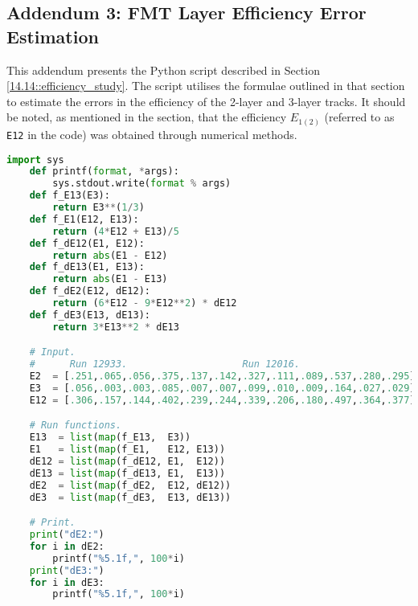 \subsection*{Addendum 3: FMT Layer Efficiency Error Estimation}
\label{20.03::fmt_layer_efficiency_error_estimation}
    This addendum presents the Python script described in Section \ref{14.14::efficiency_study}.
    The script utilises the formulae outlined in that section to estimate the errors in the efficiency of the 2-layer and 3-layer tracks.
    It should be noted, as mentioned in the section, that the efficiency $E_{1(2)}$ (referred to as \verb|E12| in the code) was obtained through numerical methods.

    \begin{lstlisting}[language=Python]
    import sys
    def printf(format, *args):
        sys.stdout.write(format % args)
    def f_E13(E3):
        return E3**(1/3)
    def f_E1(E12, E13):
        return (4*E12 + E13)/5
    def f_dE12(E1, E12):
        return abs(E1 - E12)
    def f_dE13(E1, E13):
        return abs(E1 - E13)
    def f_dE2(E12, dE12):
        return (6*E12 - 9*E12**2) * dE12
    def f_dE3(E13, dE13):
        return 3*E13**2 * dE13

    # Input.
    #      Run 12933.                    Run 12016.
    E2  = [.251,.065,.056,.375,.137,.142,.327,.111,.089,.537,.280,.295]
    E3  = [.056,.003,.003,.085,.007,.007,.099,.010,.009,.164,.027,.029]
    E12 = [.306,.157,.144,.402,.239,.244,.339,.206,.180,.497,.364,.377]

    # Run functions.
    E13  = list(map(f_E13,  E3))
    E1   = list(map(f_E1,   E12, E13))
    dE12 = list(map(f_dE12, E1,  E12))
    dE13 = list(map(f_dE13, E1,  E13))
    dE2  = list(map(f_dE2,  E12, dE12))
    dE3  = list(map(f_dE3,  E13, dE13))

    # Print.
    print("dE2:")
    for i in dE2:
        printf("%5.1f,", 100*i)
    print("dE3:")
    for i in dE3:
        printf("%5.1f,", 100*i)
    \end{lstlisting}
